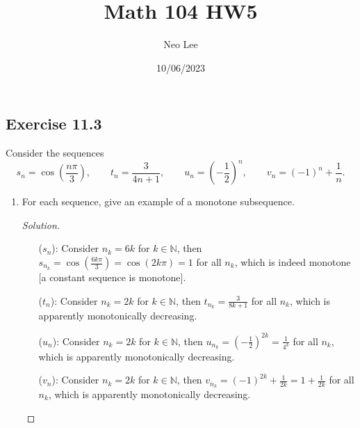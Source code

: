 \documentclass{article}
\title{Math 104 HW5}
\author{Neo Lee}
\date{10/06/2023}
\begin{document}
 

\maketitle 

\subsection*{Exercise 11.3}
Consider the sequences
$$s_n=\cos\left(\frac{n\pi}{3}\right), \qquad t_n=\frac{3}{4n+1}, \qquad 
u_n=\left(-\frac{1}{2}\right)^n, \qquad v_n=(-1)^n+\frac{1}{n}.$$
\begin{enumerate}[label=(\alph*)]
    \item For each sequence, give an example of a monotone subsequence.
    \begin{proof}[Solution]\indent
        \begin{enumerate}
            \item[($s_n$):] Consider $n_k = 6k$ for $k\in\mathbb{N}$, then $s_{n_k} = 
            \cos\left(\frac{6k\pi}{3}\right)=\cos\left(2k\pi\right)=1$ for all $n_k$, which is 
            indeed monotone [a constant sequence is monotone].
            \item[($t_n$):] Consider $n_k = 2k$ for $k\in\mathbb{N}$, then $t_{n_k} =
            \frac{3}{8k+1}$ for all $n_k$, which is apparently monotonically decreasing.
            \item[($u_n$):] Consider $n_k = 2k$ for $k\in\mathbb{N}$, then $u_{n_k} =
            \left(-\frac{1}{2}\right)^{2k}=\frac{1}{4^k}$ for all $n_k$, which is apparently 
            monotonically decreasing.
            \item[($v_n$):] Consider $n_k = 2k$ for $k\in\mathbb{N}$, then $v_{n_k} =
            (-1)^{2k}+\frac{1}{2k}=1+\frac{1}{2k}$ for all $n_k$, which is apparently monotonically 
            decreasing.
        \end{enumerate}


\end{proof}
\end{enumerate}
\end{document}
